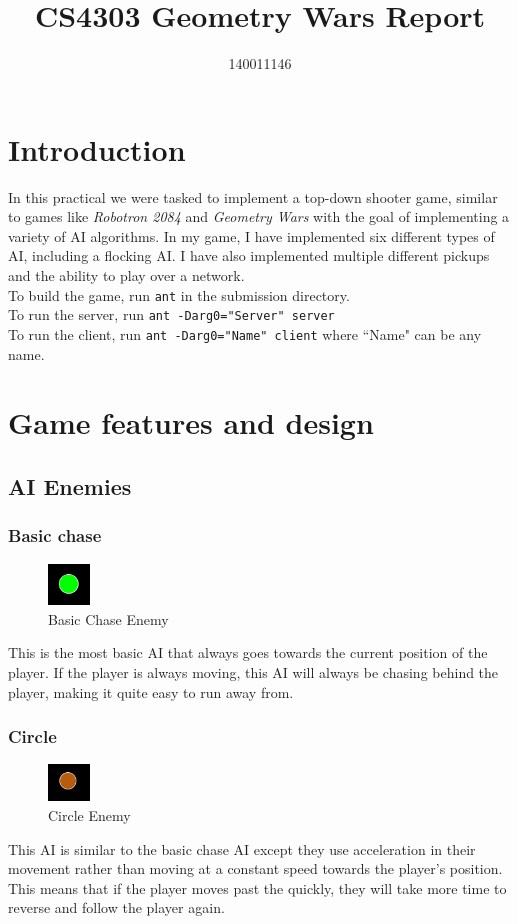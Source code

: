 \documentclass{article}
\title{CS4303 Geometry Wars Report}
\author{140011146}
\newcommand{\n}[0]{\\[\baselineskip]}
\begin{document}
\maketitle

\section{Introduction}
In this practical we were tasked to implement a top-down shooter game, similar to games like \textit{Robotron 2084} and \textit{Geometry Wars} with the goal of implementing a variety of AI algorithms. In my game, I have implemented six different types of AI, including a flocking AI. I have also implemented multiple different pickups and the ability to play over a network.
\n
To build the game, run \texttt{ant} in the submission directory.
\\
\noindent
To run the server, run \texttt{ant -Darg0="Server" server}
\\
\noindent
To run the client, run \texttt{ant -Darg0="Name" client} where ``Name" can be any name.
\section{Game features and design}
\subsection{AI Enemies}
\subsubsection{Basic chase}
\begin{figure} [H]
\centering
\includegraphics[width=0.1\textwidth, keepaspectratio]{imgs/BasicChaseEnemy.png}
\caption{Basic Chase Enemy}
\end{figure}
\noindent
This is the most basic AI that always goes towards the current position of the player. If the player is always moving, this AI will always be chasing behind the player, making it quite easy to run away from.

\subsubsection{Circle}
\begin{figure}[H]
\centering
\includegraphics[width=0.1\textwidth, keepaspectratio]{imgs/CircleEnemy.png}
\caption{Circle Enemy}
\end{figure}
\noindent
This AI is similar to the basic chase AI except they use acceleration in their movement rather than moving at a constant speed towards the player's position. This means that if the player moves past the quickly, they will take more time to reverse and follow the player again. 
\end{document}
